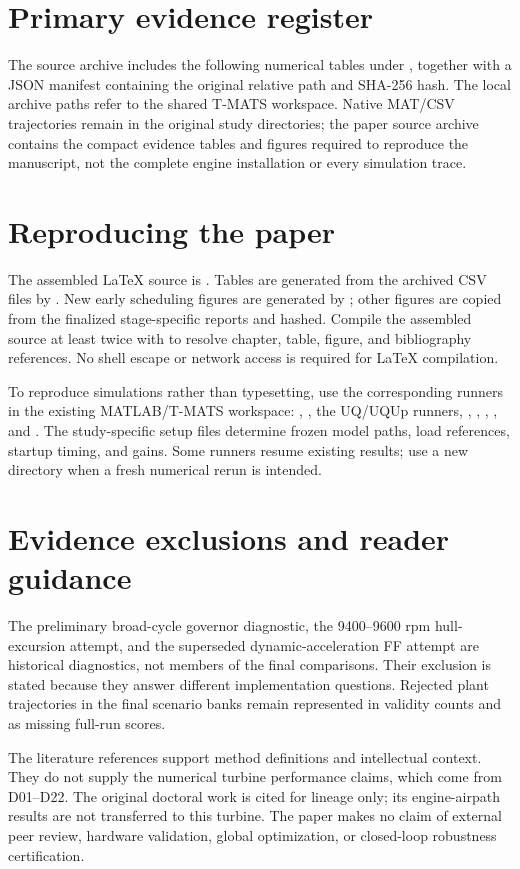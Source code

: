 \documentclass[11pt,a4paper,oneside]{report}
\begin{document}
\section{Primary evidence register}
The source archive includes the following numerical tables under , together with a JSON manifest containing the original relative path and SHA-256 hash. The local archive paths refer to the shared T-MATS workspace. Native MAT/CSV trajectories remain in the original study directories; the paper source archive contains the compact evidence tables and figures required to reproduce the manuscript, not the complete engine installation or every simulation trace.


\section{Reproducing the paper}
The assembled LaTeX source is . Tables are generated from the archived CSV files by . New early scheduling figures are generated by ; other figures are copied from the finalized stage-specific reports and hashed. Compile the assembled source at least twice with  to resolve chapter, table, figure, and bibliography references. No shell escape or network access is required for LaTeX compilation.

To reproduce simulations rather than typesetting, use the corresponding runners in the existing MATLAB/T-MATS workspace: , , the UQ/UQUp runners, , , , , and . The study-specific setup files determine frozen model paths, load references, startup timing, and gains. Some runners resume existing results; use a new directory when a fresh numerical rerun is intended.

\section{Evidence exclusions and reader guidance}
The preliminary broad-cycle governor diagnostic, the 9400--9600 rpm hull-excursion attempt, and the superseded dynamic-acceleration FF attempt are historical diagnostics, not members of the final comparisons. Their exclusion is stated because they answer different implementation questions. Rejected plant trajectories in the final scenario banks remain represented in validity counts and as missing full-run scores.

The literature references support method definitions and intellectual context. They do not supply the numerical turbine performance claims, which come from D01--D22. The original doctoral work is cited for lineage only; its engine-airpath results are not transferred to this turbine. The paper makes no claim of external peer review, hardware validation, global optimization, or closed-loop robustness certification.

\clearpage

\end{document}
